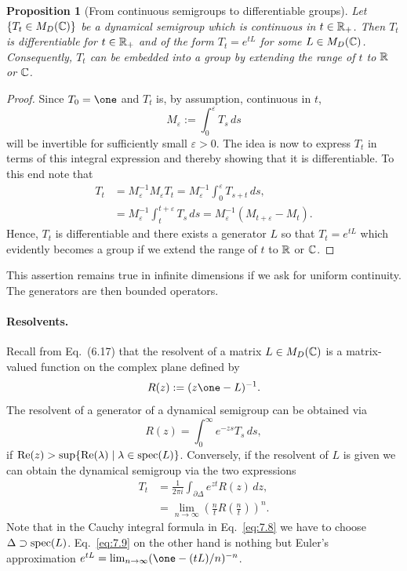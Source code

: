 \documentclass[11pt,a4paper]{article}
\theoremstyle{plain}
\newtheorem{proposition}{Proposition}
\begin{document}
\begin{proposition}[From continuous semigroups to differentiable groups]
    Let $\{T_t\in M_D(\mathbb{C})\}$ be a dynamical semigroup which is continuous in $t\in\mathbb{R}_{+}$. Then $T_t$ is differentiable for $t\in\mathbb{R}_{+}$ and of the form $T_t=e^{tL}$ for some $L\in M_D(\mathbb{C})$. Consequently, $T_t$ can be embedded into a group by extending the range of $t$ to $\mathbb{R}$ or $\mathbb{C}$.
\end{proposition}

\begin{proof}
    Since $T_0=\one$ and $T_t$ is, by assumption, continuous in $t$,
    \begin{equation}\label{eq:7.3}
        M_\varepsilon := \int_0^\varepsilon T_s\,ds
    \end{equation}
    will be invertible for sufficiently small $\varepsilon>0$. The idea is now to express $T_t$ in terms of this integral expression and thereby showing that it is differentiable. To this end note that
    \begin{align}
        T_t
         &= M_\varepsilon^{-1}M_\varepsilon T_t
        = M_\varepsilon^{-1}\int_0^\varepsilon T_{s+t}\,ds, \label{eq:7.4}\\
         &= M_\varepsilon^{-1}\int_t^{t+\varepsilon} T_s\,ds
        = M_\varepsilon^{-1}(M_{t+\varepsilon}-M_t). \label{eq:7.5}
    \end{align}
    Hence, $T_t$ is differentiable and there exists a generator $L$ so that $T_t=e^{tL}$ which evidently becomes a group if we extend the range of $t$ to $\mathbb{R}$ or $\mathbb{C}$.
\end{proof}

This assertion remains true in infinite dimensions if we ask for uniform continuity. The generators are then bounded operators.

\paragraph{Resolvents.}
Recall from Eq.~(6.17) that the resolvent of a matrix $L\in M_D(\mathbb{C})$ is a matrix-valued function on the complex plane defined by
\begin{equation}\label{eq:7.6}
    R(z) := (z\one - L)^{-1}.
\end{equation}
The resolvent of a generator of a dynamical semigroup can be obtained via
\begin{equation}\label{eq:7.7}
    R(z) = \int_0^\infty e^{-zs}T_s\,ds,
\end{equation}
if $\operatorname{Re}(z)>\sup\{\operatorname{Re}(\lambda)\mid \lambda\in\operatorname{spec}(L)\}$. Conversely, if the resolvent of $L$ is given we can obtain the dynamical semigroup via the two expressions
\begin{align}
    T_t
     &= \frac{1}{2\pi i}\int_{\partial\Delta} e^{zt}R(z)\,dz, \label{eq:7.8}\\
     &= \lim_{n\to\infty}\left(\frac{n}{t}R\!\left(\frac{n}{t}\right)\right)^{\!n}. \label{eq:7.9}
\end{align}
Note that in the Cauchy integral formula in Eq.~\eqref{eq:7.8} we have to choose $\Delta\supset \operatorname{spec}(L)$. Eq.~\eqref{eq:7.9} on the other hand is nothing but Euler's approximation $e^{tL}=\lim_{n\to\infty}(\one-(tL)/n)^{-n}$.
\end{document}
